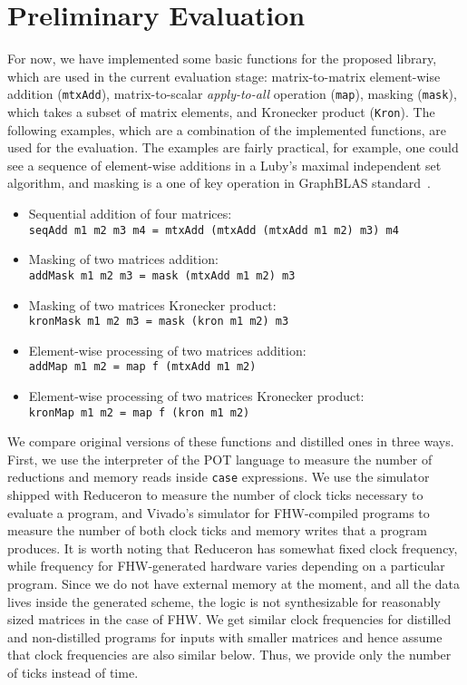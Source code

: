 \section{Preliminary Evaluation}

For now, we have implemented some basic functions for the proposed library, which are used in the current evaluation stage: matrix-to-matrix element-wise addition (\verb|mtxAdd|),
matrix-to-scalar \emph{apply-to-all} operation (\verb|map|),
masking (\verb|mask|), which takes a subset of matrix elements, and Kronecker product (\verb|Kron|).
The following examples, which are a combination of the implemented functions, are used for the evaluation. 
The examples are fairly practical, for example, one could see a sequence of element-wise additions in a Luby's maximal independent set algorithm, and masking is a one of key operation in GraphBLAS standard~\cite{buluc2017graphblas}.

\begin{itemize}
\item Sequential addition of four matrices:\\
  \verb|seqAdd m1 m2 m3 m4 = mtxAdd (mtxAdd (mtxAdd m1 m2) m3) m4|
\item Masking of two matrices addition:\\
  \verb|addMask m1 m2 m3 = mask (mtxAdd m1 m2) m3|
\item Masking of two matrices Kronecker product:\\
  \verb|kronMask m1 m2 m3 = mask (kron m1 m2) m3 |  
\item Element-wise processing of two matrices addition:\\
  \verb|addMap m1 m2 = map f (mtxAdd m1 m2)|  
\item Element-wise processing of two matrices Kronecker product:\\
  \verb|kronMap m1 m2 = map f (kron m1 m2)|  
\end{itemize}

We compare original versions of these functions and distilled ones in three ways.
First, we use the interpreter of the POT language to measure the number of reductions and memory reads inside \verb|case| expressions.
We use the simulator shipped with Reduceron to measure the number of clock ticks necessary to evaluate a program, and Vivado's simulator for FHW-compiled programs to measure the number of both clock ticks and memory writes that a program produces.
It is worth noting that Reduceron has somewhat fixed clock frequency, while frequency for FHW-generated hardware varies depending on a particular program. 
Since we do not have external memory at the moment, and all the data lives inside the generated scheme, the logic is not synthesizable for reasonably sized matrices in the case of FHW.
We get similar clock frequencies for distilled and non-distilled programs for inputs with smaller matrices and hence assume that clock frequencies are also similar below. 
Thus, we provide only the number of ticks instead of time.

